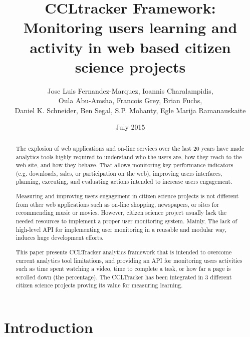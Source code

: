 \documentclass{article}
\title{CCLtracker Framework: Monitoring users learning and activity in web based citizen science projects
}
\author{ Jose Luis Fernandez-Marquez, Ioannis Charalampidis,\\ Oula Abu-Amsha, Francois Grey, Brian Fuchs, \\ Daniel K. Schneider, Ben Segal, S.P. Mohanty, Egle Marija Ramanauskaite}
\date{July 2015}
\begin{document}
\maketitle

\begin{abstract}
The explosion of web applications and on-line services over the last 20 years have made analytics tools highly required to understand who the users are, how they reach to the web site, and how they behave. That allows monitoring key performance indicators (e.g. downloads, sales, or participation on the web), improving users interfaces, planning, executing, and evaluating actions intended to increase users engagement. 

Measuring and improving users engagement in citizen science projects is not different from other web applications such as on-line shopping, newspapers, or sites for recommending music or movies. However, citizen science project usually lack the needed resources to implement a proper user monitoring system. Mainly, The lack of high-level API for implementing user monitoring in a reusable and modular way, induces huge development efforts.  

This paper presents CCLTracker analytics framework that is intended to overcome current analytics tool limitations, and providing an API for monitoring users activities such as time spent watching a video, time to complete a task, or how far a page is scrolled down (the percentage). The CCLTracker has been integrated in 3 different citizen science projects proving its value for measuring learning. 

\end{abstract}

\section{Introduction}

\end{document}
